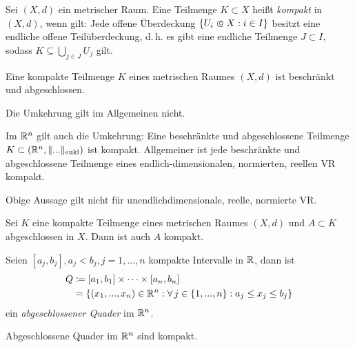 \documentclass{cheat-sheet}
\newcommand\opn{\mathrel{\ooalign{$\subset$\cr
  \hidewidth\raise.1ex\hbox{$\circ\mkern.5mu$}\cr}}}
\begin{document}
\begin{defn}
Sei $(X, d)$ ein metrischer Raum. Eine Teilmenge $K \subset X$ heißt \emph{kompakt} in $(X, d)$, wenn gilt: Jede offene Überdeckung $\{ U_i \opn X : i \in I \}$ besitzt eine endliche offene Teilüberdeckung, d.\,h. es gibt eine endliche Teilmenge $J \subset I$, sodass $K \subseteq \bigcup_{j \in J} U_j$ gilt.
\end{defn}


\begin{satz}
Eine kompakte Teilmenge $K$ eines metrischen Raumes $(X, d)$ ist beschränkt und abgeschlossen.
\end{satz}

\begin{acht}
Die Umkehrung gilt im Allgemeinen nicht.
\end{acht}

\begin{satz}
Im $\mathbb{R}^n$ gilt auch die Umkehrung: Eine beschränkte und abgeschlossene Teilmenge $K \subset (\mathbb{R}^n, \| ... \|_\text{eukl})$ ist kompakt. Allgemeiner ist jede beschränkte und abgeschlossene Teilmenge eines endlich-dimensionalen, normierten, reellen VR kompakt.
\end{satz}

\begin{acht}
Obige Aussage gilt nicht für unendlichdimensionale, reelle, normierte VR.
\end{acht}


\begin{satz}
Sei $K$ eine kompakte Teilmenge eines metrischen Raumes $(X, d)$ und $A \subset K$ abgeschlossen in $X$. Dann ist auch $A$ kompakt.
\end{satz}

\begin{defn}
Seien $[a_j, b_j], a_j < b_j, j = 1, ..., n$ kompakte Intervalle in $\mathbb{R}$, dann ist
\begin{align*}
  Q &\coloneqq [a_1, b_1] \times \cdots \times [a_n, b_n]\\
  &= \left\{ (x_1, ..., x_n) \in \mathbb{R}^n : \forall\,j \in \{ 1, ..., n \} : a_j \le x_j \le b_j \right\}
\end{align*}
ein \emph{abgeschlossener Quader} im $\mathbb{R}^n$.
\end{defn}

\begin{satz}
Abgeschlossene Quader im $\mathbb{R}^n$ sind kompakt.
\end{satz}
\end{document}
